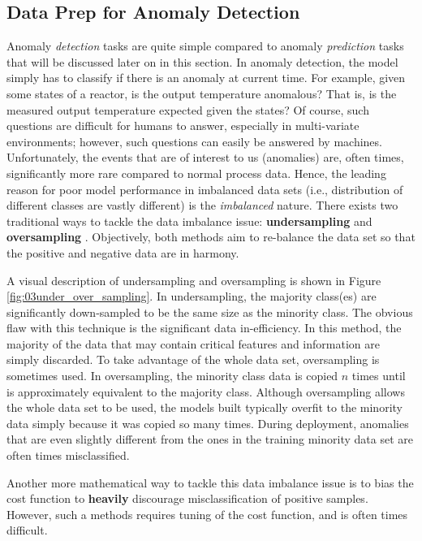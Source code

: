 \subsection{Data Prep for Anomaly Detection}
Anomaly \textit{detection} tasks are quite simple compared to anomaly \textit{prediction} tasks that will be discussed later on in this section. In anomaly detection, the model simply has to classify if there is an anomaly at current time. For example, given some states of a reactor, is the output temperature anomalous? That is, is the measured output temperature expected given the states?  Of course, such questions are difficult for humans to answer, especially in multi-variate environments; however, such questions can easily be answered by machines. Unfortunately, the events that are of interest to us (anomalies) are, often times, significantly more rare compared to normal process data. Hence, the leading reason for poor model performance in imbalanced data sets (i.e., distribution of different classes are vastly different) is the \textit{imbalanced} nature.  There exists two traditional ways to tackle the data imbalance issue: \textbf{undersampling} and \textbf{oversampling} \cite{under_over_sampling}.  Objectively, both methods aim to re-balance the data set so that the positive and negative data are in harmony.

A visual description of undersampling and oversampling is shown in Figure \ref{fig:03under_over_sampling}. In undersampling, the majority class(es) are significantly down-sampled to be the same size as the minority class.  The obvious flaw with this technique is the significant data in-efficiency.  In this method, the majority of the data that may contain critical features and information are simply discarded.  To take advantage of the whole data set, oversampling is sometimes used.  In oversampling, the minority class data is copied $n$ times until is approximately equivalent to the majority class.  Although oversampling allows the whole data set to be used, the models built typically overfit to the minority data simply because it was copied so many times.  During deployment, anomalies that are even slightly different from the ones in the training minority data set are often times misclassified.

Another more mathematical way to tackle this data imbalance issue is to bias the cost function to \textbf{heavily} discourage misclassification of positive samples.  However, such a methods requires tuning of the cost function, and is often times difficult.

